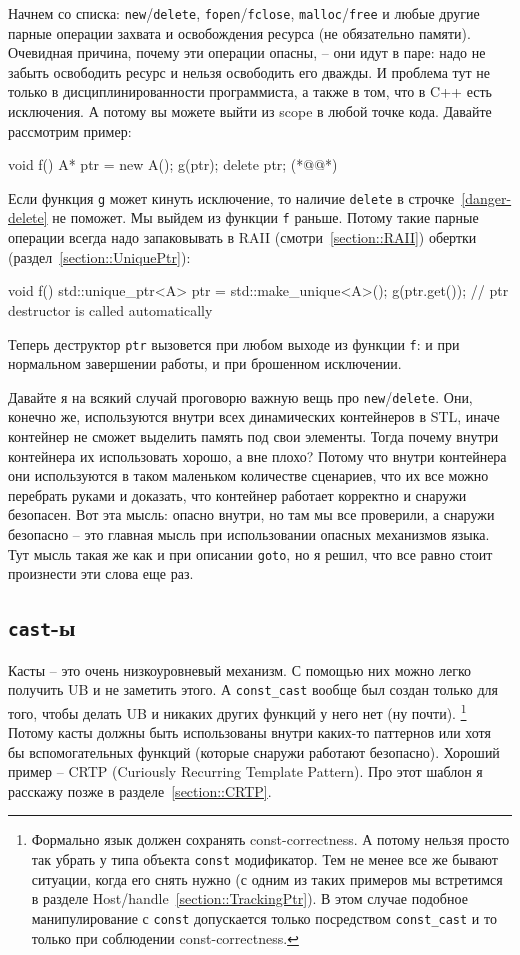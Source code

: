 Начнем со списка: \texttt{new}/\texttt{delete}, \texttt{fopen}/\texttt{fclose}, \texttt{malloc}/\texttt{free} и любые другие парные операции захвата и освобождения ресурса (не обязательно памяти).
Очевидная причина, почему эти операции опасны, -- они идут в паре: надо не забыть освободить ресурс и нельзя освободить его дважды.
И проблема тут не только в дисциплинированности программиста, а также в том, что в C++ есть исключения.
А потому вы можете выйти из scope в любой точке кода.
Давайте рассмотрим пример:
\begin{cppcode}
void f() {
  A* ptr = new A();
  g(ptr);
  delete ptr; (*@@*)
}
\end{cppcode}
Если функция \verb"g" может кинуть исключение, то наличие \verb"delete" в строчке~\ref{danger-delete} не поможет.
Мы выйдем из функции \verb"f" раньше.
Потому такие парные операции всегда надо запаковывать в RAII (смотри~\ref{section::RAII}) обертки (раздел~\ref{section::UniquePtr}):
\begin{cppcode}
void f() {
  std::unique_ptr<A> ptr = std::make_unique<A>();
  g(ptr.get());
} // ptr destructor is called automatically
\end{cppcode}
Теперь деструктор \verb"ptr" вызовется при любом выходе из функции \verb"f": и при нормальном завершении работы, и при брошенном исключении.

Давайте я на всякий случай проговорю важную вещь про \verb"new"/\verb"delete".
Они, конечно же, используются внутри всех динамических контейнеров в STL, иначе контейнер не сможет выделить память под свои элементы.
Тогда почему внутри контейнера их использовать хорошо, а вне плохо?
Потому что внутри контейнера они используются в таком маленьком количестве сценариев, что их все можно перебрать руками и доказать, что контейнер работает корректно и снаружи безопасен.
Вот эта мысль: опасно внутри, но там мы все проверили, а снаружи безопасно -- это главная мысль при использовании опасных механизмов языка.
Тут мысль такая же как и при описании \verb"goto", но я решил, что все равно стоит произнести эти слова еще раз.

\subsection{\texttt{cast}-ы}

Касты -- это очень низкоуровневый механизм.
С помощью них можно легко получить UB и не заметить этого.
А \verb"const_cast" вообще был создан только для того, чтобы делать UB и никаких других функций у него нет (ну почти).%
\footnote{Формально язык должен сохранять const-correctness.
А потому нельзя просто так убрать у типа объекта \texttt{const} модификатор.
Тем не менее все же бывают ситуации, когда его снять нужно (с одним из таких примеров мы встретимся в разделе Host/handle~\ref{section::TrackingPtr}).
В этом случае подобное манипулирование с \texttt{const} допускается только посредством \texttt{const\_cast} и то только при соблюдении const-correctness.}
Потому касты должны быть использованы внутри каких-то паттернов или хотя бы вспомогательных функций (которые снаружи работают безопасно).
Хороший пример -- CRTP (Curiously Recurring Template Pattern).
Про этот шаблон я расскажу позже в разделе~\ref{section::CRTP}.

